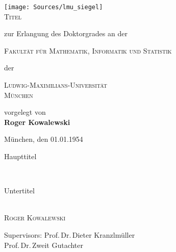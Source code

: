 
\begin{titlepage}
	\begin{center}
        \texttt{[image: Sources/lmu\_siegel]}\\
        \vskip 1cm
		\textsc{\huge Titel}
                \vskip 1cm
                \begin{large}
                  zur Erlangung des Doktorgrades an der\\[0.50cm]
                  \begin{Large}
                    \textsc{Fakultät für Mathematik, Informatik und Statistik}\\[0.50cm]
                  \end{Large}
                  der\\[0.50cm]
                  \begin{Large}
                    \textsc{Ludwig-Maximilians-Universität\\München}\par
                  \end{Large}
                \end{large}
		\vfill
                {\large vorgelegt von}\\[0.5cm]
                {\LARGE \bfseries Roger Kowalewski}
    \vskip 1cm
    \begin{small}
        München, den 01.01.1954
    \end{small}
	\end{center}
\end{titlepage}


\begin{titlepage}
  \phantom{}
  \vfill
  \begin{center}
    \begin{singlespace*}
    \begin{Huge}
     Haupttitel
    \end{Huge}\\[0.2cm]
    \begin{Large}
      Untertitel
    \end{Large}\\[1em]
      \vskip 0.25cm
      \textsc{Roger Kowalewski}\par
    \end{singlespace*}
  \end{center}
  \vfill
  \begin{singlespace*}
    Supervisors:            Prof.\,Dr.\,Dieter Kranzlmüller\\
    \phantom{Supervisors:}  Prof.\,Dr.\,Zweit Gutachter
  \end{singlespace*}
\end{titlepage}

\newpage
\null
\thispagestyle{empty}
\newpage
